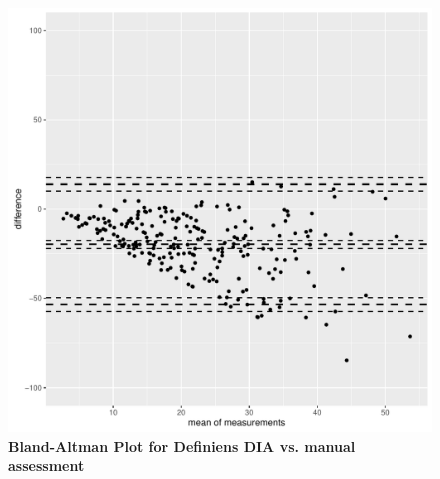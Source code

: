 \documentclass[final,5p,times,twocolumn]{elsarticle}
\begin{document}
\begin{figure}
\includegraphics[page=3, scale=0.4]{baplot.pdf}
\centering
\caption{{\bf Bland-Altman Plot for Definiens DIA vs. manual assessment}}
\label{baplot3}
\end{figure}
\end{document}
